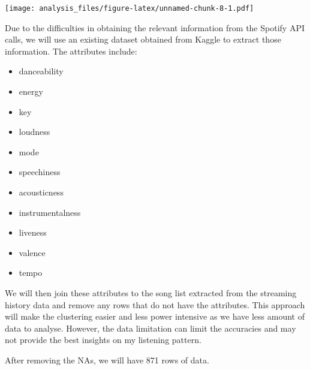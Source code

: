 \documentclass[
]{article}
\begin{document}
\texttt{[image: analysis\_files/figure-latex/unnamed-chunk-8-1.pdf]}

Due to the difficulties in obtaining the relevant information from the
Spotify API calls, we will use an existing dataset obtained from Kaggle
to extract those information. The attributes include:

\begin{itemize}
\item
  danceability
\item
  energy
\item
  key
\item
  loudness
\item
  mode
\item
  speechiness
\item
  acousticness
\item
  instrumentalness
\item
  liveness
\item
  valence
\item
  tempo
\end{itemize}

We will then join these attributes to the song list extracted from the
streaming history data and remove any rows that do not have the
attributes. This approach will make the clustering easier and less power
intensive as we have less amount of data to analyse. However, the data
limitation can limit the accuracies and may not provide the best
insights on my listening pattern.

After removing the NAs, we will have 871 rows of data.
\end{document}
